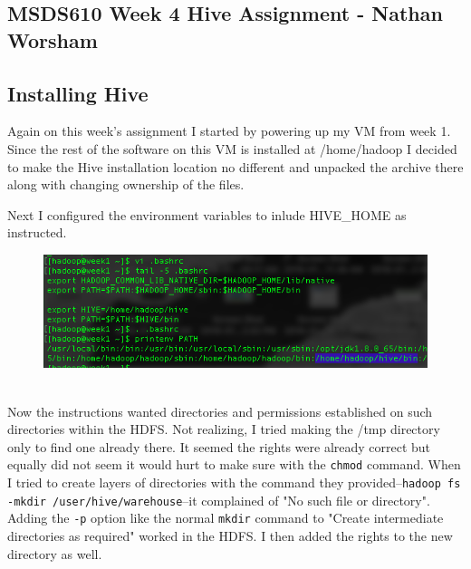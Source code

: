 \documentclass[10pt]{article}
\begin{document}
\subsection*{MSDS610 Week 4 Hive Assignment - Nathan Worsham}
\subsection*{Installing Hive}
Again on this week's assignment I started by powering up my VM from week 1. Since the rest of the software on this VM is installed at /home/hadoop I decided to make the Hive installation location no different and unpacked the archive there along with changing ownership of the files. 
\par
{}%
\hfill
{}%
\par
Next I configured the environment variables to inlude HIVE\_HOME as instructed.
\begin{figure}[!h]
\includegraphics[scale=0.37]{printenv.png}
\centering
\end{figure}\\
\indent Now the instructions wanted directories and permissions established on such directories within the HDFS. Not realizing, I tried making the /tmp directory only to find one already there. It seemed the rights were already correct but equally did not seem it would hurt to make sure with the \verb|chmod| command. When I tried to create layers of directories with the command they provided--\verb|hadoop fs -mkdir /user/hive/warehouse|--it complained of "No such file or directory". Adding the \verb|-p| option like the normal \verb|mkdir| command to "Create intermediate directories as required" worked in the HDFS. I then added the rights to the new directory as well. 
\end{document}
